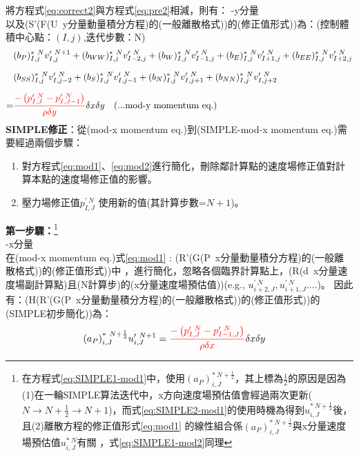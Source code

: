 \documentclass[12pt]{article}
\theoremstyle{upright}
\begin{document}
\noindent 將方程式\eqref{eq:correct2}與方程式\eqref{eq:pre2}相減，則有：
\noindent -y分量\\
\noindent 以及(S'(F(U\ y分量動量積分方程)的(一般離散格式))的(修正值形式))為：(控制體積中心點：$(I,j)$,迭代步數：N)
\begin{equation}\label{eq:mod2}\begin{split}
    &(b_{P})_{I,j}^{*\ N}v_{I,j}^{\prime\ N+1} + (b_{WW})_{I,j}^{*\ N}v_{I-2,j}^{\prime\ N} + (b_{W})_{I,j}^{*\ N}v_{I-1,j}^{\prime\ N} + (b_{E})_{I,j}^{*\ N}v_{I+1,j}^{\prime\ N} + (b_{EE})_{I,j}^{*\ N}v_{I+2,j}^{\prime\ N} \\[1.5ex]
    &(b_{SS})_{I,j}^{*\ N}v_{I,j-2}^{\prime\ N} + (b_{S})_{I,j}^{*\ N}v_{I,j-1}^{\prime\ N} + (b_{N})_{I,j}^{*\ N}v_{I,j+1}^{\prime\ N} + (b_{NN})_{I,j}^{*\ N}v_{I,j+2}^{\prime\ N} \\[1.5ex]
   =& {\color{red}\frac{-\left(p_{I,J}^{\prime\ N} - p_{I,J-1}^{\prime\ N}\right)}{\rho \delta y}}\delta x \delta y\quad \text{(...mod-y momentum eq.)}
\end{split}\end{equation}
\noindent \textbf{SIMPLE修正}：從(mod-x momentum eq.)到(SIMPLE-mod-x momentum eq.)需要經過兩個步驟：
\begin{enumerate}
    \item 對方程式\eqref{eq:mod1}、\eqref{eq:mod2}進行簡化，刪除鄰計算點的速度場修正值對計算本點的速度場修正值的影響。
    \item 壓力場修正值$p_{I,J}^{\prime\ N}$ 使用新的值(其計算步數=$N+1$)。
\end{enumerate}
\noindent \textbf{第一步驟：}\footnote{在方程式\eqref{eq:SIMPLE1-mod1}中，使用$(a_{P})_{i,J}^{*\ N+\frac{1}{2}}$，其上標為$\frac{1}{2}$的原因是因為(1)在一輪SIMPLE算法迭代中，x方向速度場預估值會經過兩次更新($N\rightarrow N+\frac{1}{2} \rightarrow N+1$)，而式\eqref{eq:SIMPLE2-mod1}的使用時機為得到$u_{i,J}^{*\ N+\frac{1}{2}}$後，且(2)離散方程的修正值形式\eqref{eq:mod1} 的線性組合係$(a_{P})_{i,J}^{*\ N+\frac{1}{2}}$與x分量速度場預估值$u_{i,J}^{*\ N}$有關 ，式\eqref{eq:SIMPLE1-mod2}同理}\\
\noindent -x分量\\
\noindent 在(mod-x momentum eq.)式\eqref{eq:mod1} : (R'(G(P\ x分量動量積分方程)的(一般離散格式))的(修正值形式))中 ，進行簡化，{\color{red}忽略各個臨界計算點上，(R(d\ x分量速度場副計算點)且(N計算步)的(x分量速度場預估值))(e.g., $u_{i+2,J}^{\prime\ N},u_{i+1,J}^{\prime\ N}....$)}。
因此有：(H(R'(G(P\ x分量動量積分方程)的(一般離散格式))的(修正值形式))的(SIMPLE初步簡化))為：
\begin{equation}\label{eq:SIMPLE1-mod1}\begin{split}
    &(a_{P})_{i,J}^{*\ N+\frac{1}{2}}u_{i,J}^{\prime\ N+1}
    ={\color{red}\frac{-\left(p_{I,J}^{\prime\ N} - p_{I-1,J}^{\prime\ N}\right)}{\rho \delta x}}\delta x \delta y  
\end{split}\end{equation}
\end{document}
